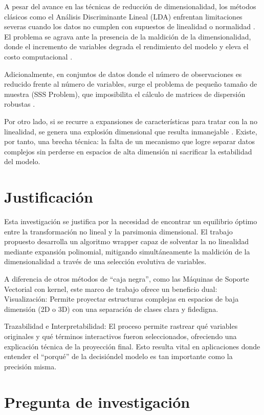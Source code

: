 A pesar del avance en las técnicas de reducción de dimensionalidad, los métodos clásicos como el Análisis Discriminante Lineal (LDA) enfrentan limitaciones severas cuando los datos no cumplen con supuestos de linealidad o normalidad \cite{feng2021comparison}. El problema se agrava ante la presencia de la maldición de la dimensionalidad, donde el incremento de variables degrada el rendimiento del modelo y eleva el costo computacional \cite{asaduzzaman2024dimensionality}.

Adicionalmente, en conjuntos de datos donde el número de observaciones es reducido frente al número de variables, surge el problema de pequeño tamaño de muestra (SSS Problem), que imposibilita el cálculo de matrices de dispersión robustas \cite{sharma2015linear}. 

Por otro lado, si se recurre a expansiones de características para tratar con la no linealidad, se genera una explosión dimensional que resulta inmanejable \cite{bishop2006pattern}. Existe, por tanto, una brecha técnica: la falta de un mecanismo que logre separar datos complejos sin perderse en espacios de alta dimensión ni sacrificar la estabilidad del modelo.

\section{Justificación}
\label{sec:Justificación}

Esta investigación se justifica por la necesidad de encontrar un equilibrio óptimo entre la transformación no lineal y la parsimonia dimensional. El trabajo propuesto desarrolla un algoritmo wrapper capaz de solventar la no linealidad mediante expansión polinomial, mitigando simultáneamente la maldición de la dimensionalidad a través de una selección evolutiva de variables.

A diferencia de otros métodos de “caja negra”, como las Máquinas de Soporte Vectorial con kernel, este marco de trabajo ofrece un beneficio dual: Visualización: Permite proyectar estructuras complejas en espacios de baja dimensión (2D o 3D) con una separación de clases clara y fidedigna.

Trazabilidad e Interpretabilidad: El proceso permite rastrear qué variables originales y qué términos interactivos fueron seleccionados, ofreciendo una explicación técnica de la proyección final. Esto resulta vital en aplicaciones donde entender el “porqué” de la decisióndel modelo es tan importante como la precisión misma.

\section{Pregunta de investigación}
\label{sec:Pregunta-Investigación}

